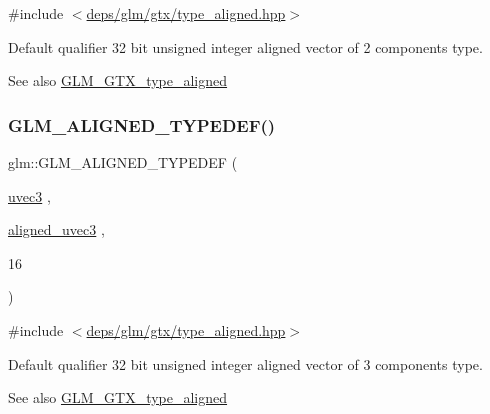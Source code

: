 {\ttfamily \#include $<$\hyperlink{gtx_2type__aligned_8hpp}{deps/glm/gtx/type\+\_\+aligned.\+hpp}$>$}

Default qualifier 32 bit unsigned integer aligned vector of 2 components type. \begin{DoxySeeAlso}{See also}
\hyperlink{group__gtx__type__aligned}{G\+L\+M\+\_\+\+G\+T\+X\+\_\+type\+\_\+aligned} 
\end{DoxySeeAlso}
\mbox{\label{group__gtx__type__aligned_ga5cec574686a7f3c8ed24bb195c5e2d0a}} 
\subsubsection{\texorpdfstring{G\+L\+M\+\_\+\+A\+L\+I\+G\+N\+E\+D\+\_\+\+T\+Y\+P\+E\+D\+E\+F()}{GLM\_ALIGNED\_TYPEDEF()}\hspace{0.1cm}{\footnotesize\ttfamily [119/209]}}
{\footnotesize\ttfamily glm\+::\+G\+L\+M\+\_\+\+A\+L\+I\+G\+N\+E\+D\+\_\+\+T\+Y\+P\+E\+D\+EF (\begin{DoxyParamCaption}\item[{\hyperlink{group__core__types_gac4ba593917841b859ba1683b8b52b8fa}{uvec3}}]{,  }\item[{\hyperlink{group__gtc__type__aligned_ga5dee635ca69be0f5de5630a59d89034f}{aligned\+\_\+uvec3}}]{,  }\item[{16}]{ }\end{DoxyParamCaption})}



{\ttfamily \#include $<$\hyperlink{gtx_2type__aligned_8hpp}{deps/glm/gtx/type\+\_\+aligned.\+hpp}$>$}

Default qualifier 32 bit unsigned integer aligned vector of 3 components type. \begin{DoxySeeAlso}{See also}
\hyperlink{group__gtx__type__aligned}{G\+L\+M\+\_\+\+G\+T\+X\+\_\+type\+\_\+aligned} 
\end{DoxySeeAlso}
\mbox{\label{group__gtx__type__aligned_ga47edfdcee9c89b1ebdaf20450323b1d4}} 
